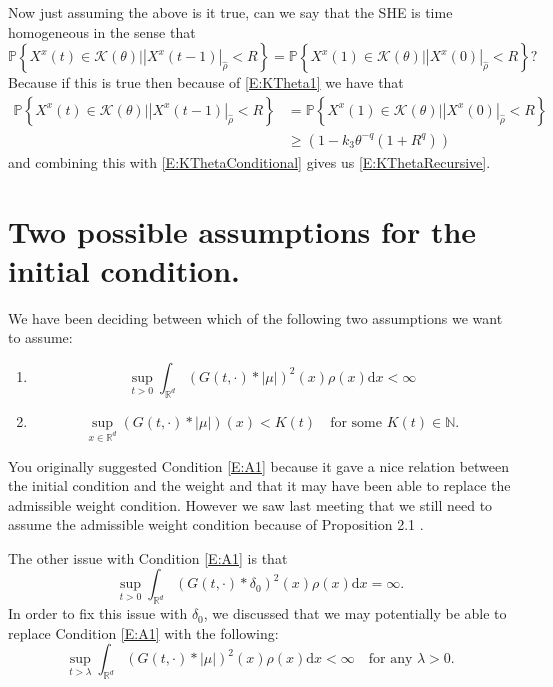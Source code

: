 \documentclass{article}
\numberwithin{equation}{section}
\newcommand{\R}{\mathbb{R}}
\newcommand{\ud}{\ensuremath{\mathrm{d}}}
\begin{document}
Now just assuming the above is it true, can we say that the SHE is time homogeneous in the sense that
	\[
			\mathbb{P}\left\{ X^x(t) \in \mathscr{K}(\theta) \bigg\vert  \left| X^x(t-1) \right|_{\hat{\rho}} < R  \right\} = \mathbb{P}\left\{ X^x(1) \in \mathscr{K}(\theta) \bigg\vert  \left| X^x(0) \right|_{\hat{\rho}} < R  \right\}?
	\]
Because if this is true then because of \eqref{E:KTheta1} we have that
	\begin{align*}
			\mathbb{P}\left\{ X^x(t) \in \mathscr{K}(\theta) \bigg\vert  \left| X^x(t-1) \right|_{\hat{\rho}} < R  \right\} &= \mathbb{P}\left\{ X^x(1) \in \mathscr{K}(\theta) \bigg\vert  \left| X^x(0) \right|_{\hat{\rho}} < R  \right\}
			\\ & \ge (1-k_3\theta^{-q}(1+R^q))
	\end{align*}
and combining this with \eqref{E:KThetaConditional} gives us \eqref{E:KThetaRecursive}.

\section{Two possible assumptions for the initial condition.}
We have been deciding between which of the following two assumptions we want to assume:
	\begin{enumerate}
		\item
			\begin{equation}\label{E:A1}
				\sup_{t>0} \int_{\R^d} (G(t,\cdot) * |\mu|)^2(x)\rho(x) \ud x < \infty
			\end{equation}
		\item
			\begin{equation} \label{E:A2}
				\sup_{x \in \R^d} (G(t,\cdot) * |\mu|)(x) < K(t) \quad \text{for some } K(t) \in \mathbb{N}.
			\end{equation}
	\end{enumerate}

You originally suggested Condition \eqref{E:A1} because it gave a nice relation between the initial condition and the weight and that it may have been able to replace the admissible weight condition. However we saw last meeting that we still need to assume the admissible weight condition because of Proposition 2.1 \cite{TZ98}.

The other issue with Condition \eqref{E:A1} is that
	\[
		\sup_{t>0} \int_{\R^d} (G(t,\cdot) * \delta_0)^2(x)\rho(x) \ud x = \infty.
	\]
In order to fix this issue with $\delta_0$, we discussed that we may potentially be able to replace Condition \eqref{E:A1} with the following:
	\begin{equation}\label{E:A1.1}
		\sup_{t>\lambda} \int_{\R^d} (G(t,\cdot) * |\mu|)^2(x)\rho(x) \ud x < \infty \quad \text{for any } \lambda > 0.
	\end{equation}
\end{document}

